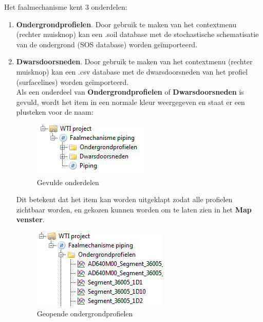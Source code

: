 Het faalmechanisme kent 3 onderdelen:
\begin{enumerate}
\item \textbf{Ondergrondprofielen}. Door gebruik te maken van het contextmenu (rechter muisknop) kan een .soil database met de stochastische schematisatie van de
ondergrond (SOS database) worden ge\"{i}mporteerd.
\item \textbf{Dwarsdoorsneden}. Door gebruik te maken van het contextmenu (rechter muisknop) kan een .csv database met de dwarsdoorsneden van het profiel (surfacelines) worden ge\"{i}mporteerd.\hfill \\

Als een onderdeel van \textbf{Ondergrondprofielen} of \textbf{Dwarsdoorsneden} is gevuld, wordt het item in een normale kleur weergegeven en staat er een plusteken voor de naam:

\begin{figure} [H]
	\centering
		\includegraphics{figures/chapter_piping/FilledFailuremechanism}
	\caption{Gevulde onderdelen}
	\label{fig:piping.FilledFailuremechanism}
\end{figure}

Dit betekent dat het item kan worden uitgeklapt zodat alle profielen zichtbaar worden, en gekozen kunnen worden om te laten zien in het \textbf{Map venster}.

\begin{figure} [H]
	\centering
		\includegraphics{figures/chapter_piping/OpenFilledFailuremechanism}
	\caption{Geopende ondergrondprofielen}
	\label{fig:piping.openFilledFailuremechanism}
\end{figure}


\end{enumerate}
